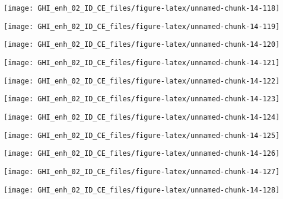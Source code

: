 \documentclass[
  10pt,
  a4paper,oneside]{article}
\begin{document}
\begin{center}\texttt{[image: GHI\_enh\_02\_ID\_CE\_files/figure-latex/unnamed-chunk-14-118]} \end{center}

\begin{center}\texttt{[image: GHI\_enh\_02\_ID\_CE\_files/figure-latex/unnamed-chunk-14-119]} \end{center}

\begin{center}\texttt{[image: GHI\_enh\_02\_ID\_CE\_files/figure-latex/unnamed-chunk-14-120]} \end{center}

\begin{center}\texttt{[image: GHI\_enh\_02\_ID\_CE\_files/figure-latex/unnamed-chunk-14-121]} \end{center}

\begin{center}\texttt{[image: GHI\_enh\_02\_ID\_CE\_files/figure-latex/unnamed-chunk-14-122]} \end{center}

\begin{center}\texttt{[image: GHI\_enh\_02\_ID\_CE\_files/figure-latex/unnamed-chunk-14-123]} \end{center}

\begin{center}\texttt{[image: GHI\_enh\_02\_ID\_CE\_files/figure-latex/unnamed-chunk-14-124]} \end{center}

\begin{center}\texttt{[image: GHI\_enh\_02\_ID\_CE\_files/figure-latex/unnamed-chunk-14-125]} \end{center}

\begin{center}\texttt{[image: GHI\_enh\_02\_ID\_CE\_files/figure-latex/unnamed-chunk-14-126]} \end{center}

\begin{center}\texttt{[image: GHI\_enh\_02\_ID\_CE\_files/figure-latex/unnamed-chunk-14-127]} \end{center}

\begin{center}\texttt{[image: GHI\_enh\_02\_ID\_CE\_files/figure-latex/unnamed-chunk-14-128]} \end{center}
\end{document}

